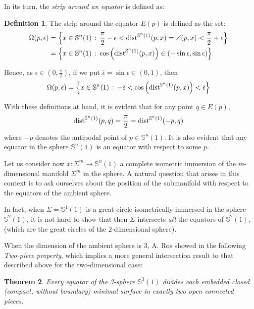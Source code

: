 \documentclass{amsart}
\newtheorem{theorem}{Theorem}[section]
\theoremstyle{definition}
\newtheorem{definition}[theorem]{Definition}
\theoremstyle{remark}
\begin{document}
    In its turn, the {\em strip around an equator } is defined as:
    
\begin{definition}
The strip around the equator $E(p)$ is defined as the set:
    $$
\begin{aligned}
\Omega(p,\epsilon)&=\left\lbrace x\in \mathbb{S}^{n}(1)\, : \, \frac{\pi}{2}-\epsilon<{\rm dist}^{\mathbb{S}^{n}(1)}(p,x)=\angle{(p,x)}<\frac{\pi}{2}+\epsilon\right\rbrace\\&=\left\lbrace x\in \mathbb{S}^{n}(1)\, : \,   \cos\left({\rm dist}^{\mathbb{S}^{n}(1)}(p,x)\right)\in ( -\sin\epsilon,\sin\epsilon) \right\rbrace
\end{aligned}
$$

\noindent Hence, as $\epsilon \in (0,\frac{\pi}{2})$, if we put $\bar \epsilon=\sin \epsilon \in (0,1)$, then
$$
\Omega(p,\epsilon) =\left\lbrace x\in \mathbb{S}^{n}(1)\, : \, -\bar \epsilon<\cos\left({\rm dist}^{\mathbb{S}^{n}(1)}(p,x)\right)<\bar \epsilon\right\rbrace
$$
\end{definition}

With these definitions at hand, it is evident that for any point $q\in E(p)$, 
        $$
{\rm dist}^{\mathbb{S}^n(1)}(p,q)=\frac{\pi}{2}={\rm dist}^{\mathbb{S}^n(1)}(-p,q)
        $$
        \noindent where $-p$ denotes the antipodal point of $p \in \mathbb{S}^{n}(1)$. It is also evident  that any equator in the sphere $\mathbb{S}^n(1)$ is an equator with respect to some $p$.
        
     Let us consider now $x: \Sigma^m \to \mathbb{S}^n(1)$  a complete isometric immersion of the  $m$-dimensional manifold $\Sigma^m$ in the sphere.  A natural question that arises in this context is to ask ourselves about the position of the submanifold with respect to the equators of the ambient sphere. 
     
     In fact, when $\Sigma=\mathbb{S}^{1}(1)$ is a great circle isometrically immersed in the sphere $\mathbb{S}^{2}(1)$, it is not hard to show that then $\Sigma$ intersects {\em all} the equators of $ \mathbb{S}^{2}(1)$, (which are the great circles of the $2$-dimensional sphere).
     
     When the dimension of the ambient sphere is $3$, A. Ros showed in \cite{R} the following {\em Two-piece property}, which implies a more general intersection result to that described above for the two-dimensional case: 
     
      \begin{theorem}
   Every equator of the 3-sphere $\mathbb{S}^3(1)$
divides each embedded closed (compact, without boundary) minimal surface in exactly two open connected pieces.
\end{theorem}
\end{document}
